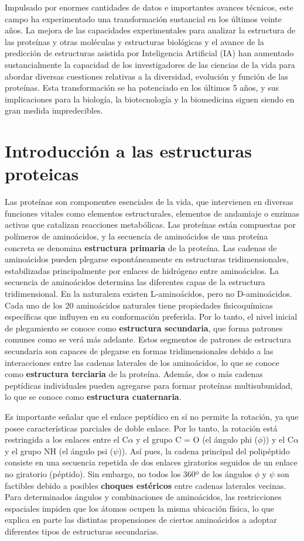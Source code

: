 Impulsado por enormes cantidades de datos e importantes avances técnicos, este campo ha experimentado una transformación sustancial en los últimos veinte años. La mejora de las capacidades experimentales para analizar la estructura de las proteínas y otras moléculas y estructuras biológicas y el avance de la predicción de estructuras asistida por Inteligencia Artificial (IA) han aumentado sustancialmente la capacidad de los investigadores de las ciencias de la vida para abordar diversas cuestiones relativas a la diversidad, evolución y función de las proteínas. Esta transformación se ha potenciado en los últimos 5 años, y sus implicaciones para la biología, la biotecnología y la biomedicina siguen siendo en gran medida impredecibles.

\section{Introducción a las estructuras proteicas}
Las proteínas son componentes esenciales de la vida, que intervienen en diversas funciones vitales como elementos estructurales, elementos de andamiaje o enzimas activas que catalizan reacciones metabólicas. Las proteínas están compuestas por polímeros de aminoácidos, y la secuencia de aminoácidos de una proteína concreta se denomina \textbf{estructura primaria} de la proteína. Las cadenas de aminoácidos pueden plegarse espontáneamente en estructuras tridimensionales, estabilizadas principalmente por enlaces de hidrógeno entre aminoácidos. La secuencia de aminoácidos determina las diferentes capas de la estructura tridimensional. En la naturaleza existen L-aminoácidos, pero no D-aminoácidos. Cada uno de los 20 aminoácidos naturales tiene propiedades fisicoquímicas específicas que influyen en su conformación preferida. Por lo tanto, el nivel inicial de plegamiento se conoce como \textbf{estructura secundaria}, que forma patrones comunes como se verá más adelante. Estos segmentos de patrones de estructura secundaria son capaces de plegarse en formas tridimensionales debido a las interacciones entre las cadenas laterales de los aminoácidos, lo que se conoce como \textbf{estructura terciaria} de la proteína. Además, dos o más cadenas peptídicas individuales pueden agregarse para formar proteínas multisubunidad, lo que se conoce como \textbf{estructura cuaternaria}.

Es importante señalar que el enlace peptídico en sí no permite la rotación, ya que posee características parciales de doble enlace. Por lo tanto, la rotación está restringida a los enlaces entre el C$\alpha$ y el grupo C = O (el ángulo phi ($\phi$)) y el C$\alpha$ y el grupo NH (el ángulo psi ($\psi$)). Así pues, la cadena principal del polipéptido consiste en una secuencia repetida de dos enlaces giratorios seguidos de un enlace no giratorio (péptido). Sin embargo, no todos los 360º de los ángulos $\phi$ y $\psi$ son factibles debido a posibles \textbf{choques estéricos} entre cadenas laterales vecinas. Para determinados ángulos y combinaciones de aminoácidos, las restricciones espaciales impiden que los átomos ocupen la misma ubicación física, lo que explica en parte las distintas propensiones de ciertos aminoácidos a adoptar diferentes tipos de estructuras secundarias. 

